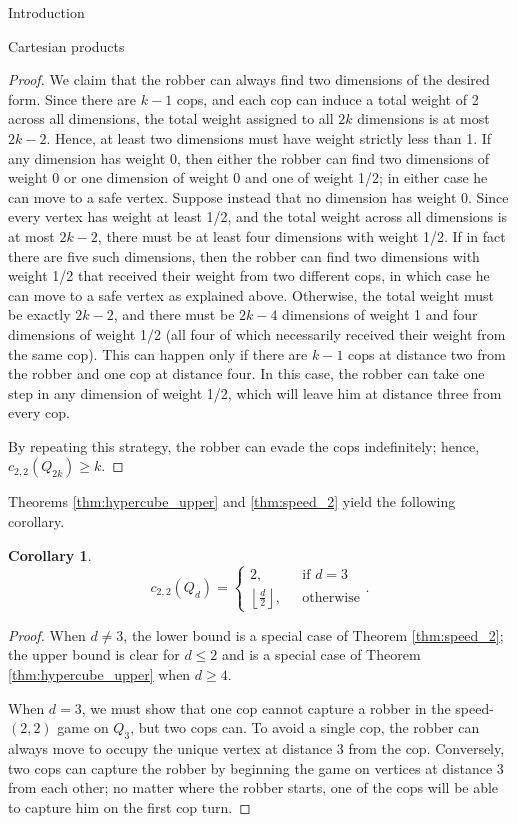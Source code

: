 \documentclass[12pt]{amsart}
\newcommand{\floor}[1]{\ensuremath{\left\lfloor #1\right\rfloor} }
\newtheorem{corollary}[lemma]{Corollary}
\theoremstyle{definition}
\newcommand{\speedtwo}{c_{2,2}}
\begin{document}
\begin{section}{Introduction}
\begin{section}{Cartesian products}
\begin{proof}
We claim that the robber can always find two dimensions of the desired form.  Since there are $k-1$ cops, and each cop can induce a total weight of 2 across all dimensions, the total weight assigned to all $2k$ dimensions is at most $2k-2$.  Hence, at least two dimensions must have weight strictly less than 1.  If any dimension has weight 0, then either the robber can find two dimensions of weight 0 or one dimension of weight 0 and one of weight 1/2; in either case he can move to a safe vertex.  Suppose instead that no dimension has weight 0.  Since every vertex has weight at least 1/2, and the total weight across all dimensions is at most $2k-2$, there must be at least four dimensions with weight 1/2.  If in fact there are five such dimensions, then the robber can find two dimensions with weight 1/2 that received their weight from two different cops, in which case he can move to a safe vertex as explained above.  Otherwise, the total weight must be exactly $2k-2$, and there must be $2k-4$ dimensions of weight 1 and four dimensions of weight 1/2 (all four of which necessarily received their weight from the same cop).  This can happen only if there are $k-1$ cops at distance two from the robber and one cop at distance four.  In this case, the robber can take one step in any dimension of weight 1/2, which will leave him at distance three from every cop.

By repeating this strategy, the robber can evade the cops indefinitely; hence, $\speedtwo(Q_{2k}) \ge k$.
\end{proof}

Theorems \ref{thm:hypercube_upper} and \ref{thm:speed_2} yield the following corollary.

\begin{corollary}\label{cor:speed_2_hypercube}
\[\speedtwo(Q_d) = \left \{\begin{array}{ll}2, \quad \quad &\text{if }d=3\\\floor{\frac{d}{2}}, &\text{otherwise}\end{array}\right . .\]
\end{corollary}
\begin{proof}
When $d \not = 3$, the lower bound is a special case of Theorem \ref{thm:speed_2}; the upper bound is clear for $d \le 2$ and is a special case of Theorem \ref{thm:hypercube_upper} when $d \ge 4$.

When $d=3$, we must show that one cop cannot capture a robber in the speed-$(2,2)$ game on $Q_3$, but two cops can.  To avoid a single cop, the robber can always move to occupy the unique vertex at distance 3 from the cop.  Conversely, two cops can capture the robber by beginning the game on vertices at distance 3 from each other; no matter where the robber starts, one of the cops will be able to capture him on the first cop turn.
\end{proof}


\end{section}
\end{section}
\end{document}
